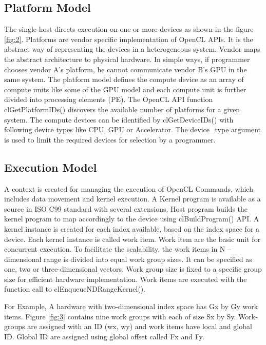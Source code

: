 \subsection{Platform Model}
The single host directs execution on one or more devices as shown in the figure \ref{fig:2}. Platforms are vendor specific implementation of OpenCL APIs. It is the abstract way of representing the devices in a heterogeneous system. Vendor maps the abstract architecture to physical hardware. In simple ways, if programmer chooses vendor A’s platform, he cannot communicate vendor B’s GPU in the same system.  The platform model defines the compute device as an array of compute units like some of the GPU model and each compute unit is further divided into processing elements (PE). The OpenCL API function clGetPlatformIDs() discovers the available number of platforms for a given system. The compute devices can be identified by clGetDeviceIDs() with following device types like CPU, GPU or Accelerator. The device\_type argument is used to limit the required devices for selection by a programmer.


\subsection{Execution Model}
A context is created for managing the execution of OpenCL Commands, which includes data movement and kernel execution. A Kernel program is available as a source in ISO C99 standard with several extensions. Host program builds the kernel program to map accordingly to the device using clBuildProgram() API. A kernel instance is created for each index available, based on the index space for a device. Each kernel instance is called work item. Work item are the basic unit for concurrent execution. To facilitate the scalability, the work items in N – dimensional range is divided into equal work group sizes. It can be specified as one, two or three-dimensional vectors. Work group size is fixed to a specific group size for efficient hardware implementation. Work items are executed with the function call to clEnqueueNDRangeKernel().

For Example, A hardware with two-dimensional index space has Gx by Gy work items. Figure \ref{fig:3} \cite{12} contains nine work groups with each of size Sx by Sy. Work-groups are assigned with an ID (wx, wy) and work items have local and global ID. Global ID are assigned using global offset called Fx and Fy. 


